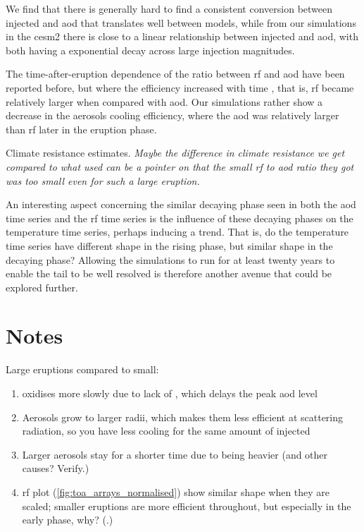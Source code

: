 \documentclass{ametsocV5}
\newcommand{\iso}[1][i]{{#1}njected \ce{SO2}}
\begin{document}
We find that there is generally hard to find a consistent conversion between \iso{} and
\ac{aod} that translates well between models, while from our simulations in the
\ac{cesm2} there is close to a linear relationship between \iso{} and \ac{aod}, with
both having a exponential decay across large injection magnitudes.

The time-after-eruption dependence of the ratio between \ac{rf} and \ac{aod} have been
reported before, but where the efficiency increased with time \citep{marshall2020}, that
is, \ac{rf} became relatively larger when compared with \ac{aod}. Our simulations rather
show a decrease in the aerosols cooling efficiency, where the \ac{aod} was relatively
larger than \ac{rf} later in the eruption phase.

Climate resistance estimates. \emph{Maybe the difference in climate resistance we get
  compared to what \citet{jones2005} used can be a pointer on that the small \ac{rf} to
  \ac{aod} ratio they got was too small even for such a large eruption.}

An interesting aspect concerning the similar decaying phase seen in both the \ac{aod}
time series and the \ac{rf} time series is the influence of these decaying phases on the
temperature time series, perhaps inducing a trend. That is, do the temperature time
series have different shape in the rising phase, but similar shape in the decaying
phase? Allowing the simulations to run for at least twenty years to enable the tail to
be well resolved is therefore another avenue that could be explored further.

\clearpage

\section*{Notes}

Large eruptions compared to small:

\begin{enumerate}
  \item {} oxidises more slowly due to lack of , which delays the peak \ac{aod}
        level
  \item Aerosols grow to larger radii, which makes them less efficient at scattering radiation,
        so you have less cooling for the same amount of \iso{}
  \item Larger aerosols stay for a shorter time due to being heavier (and other causes? Verify.)
  \item \ac{rf} plot (\cref{fig:toa_arrays_normalised}) show similar shape when they are scaled;
        smaller eruptions are more efficient throughout, but especially in the early phase, why?
        (.)
\end{enumerate}
\end{document}

